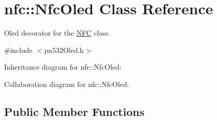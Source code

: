 \hypertarget{classnfc_1_1NfcOled}{}\section{nfc\+:\+:Nfc\+Oled Class Reference}
\label{classnfc_1_1NfcOled}


Oled decorator for the \hyperlink{classnfc_1_1NFC}{N\+FC} class.  




{\ttfamily \#include $<$pn532\+Oled.\+h$>$}



Inheritance diagram for nfc\+:\+:Nfc\+Oled\+:


Collaboration diagram for nfc\+:\+:Nfc\+Oled\+:
\subsection*{Public Member Functions}
